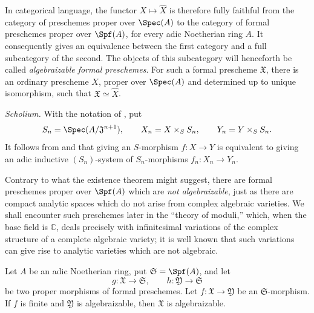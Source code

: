 In categorical language, the functor
$X\mapsto\widehat{X}$ is therefore fully faithful
 from the category of preschemes proper over
$\Spec(A)$ to the category of formal preschemes proper over
$\Spf(A)$, for every adic Noetherian ring $A$.  It consequently
gives an equivalence between the first category and a full
subcategory of the second.  The objects of this subcategory will
henceforth be called \emph{algebraizable formal preschemes}.  For
such a formal prescheme $\mathfrak{X}$, there is an ordinary
prescheme $X$, proper over $\Spec(A)$ and determined up to unique
isomorphism, such that $\mathfrak{X}\simeq\widehat{X}$.

\begin{env}[5.4.2]
\label{III.5.4.2}
\emph{Scholium.}
With the notation of , put
\[
  S_n=\Spec(A/\mathfrak{J}^{n+1}),\qquad
  X_n=X\times_S S_n,\qquad
  Y_n=Y\times_S S_n.
\]
It follows from  and  that
giving an $S$-morphism $f:X\to Y$ is equivalent to giving an adic
inductive $(S_n)$-system  of
$S_n$-morphisms $f_n:X_n\to Y_n$.
\end{env}

\begin{remark}[5.4.3]
\label{III.5.4.3}
Contrary to what the existence theorem  might
suggest, there are formal preschemes proper over $\Spf(A)$ which
are \emph{not algebraizable}, just as there are compact analytic
spaces which do not arise from complex algebraic varieties.  We
shall encounter such preschemes later in the ``theory of moduli,''
which, when the base field is $\mathbb{C}$, deals precisely with
infinitesimal variations of the complex structure of a complete
algebraic variety; it is well known that such variations can give
rise to analytic varieties which are not algebraic.
\end{remark}

\begin{proposition}[5.4.4]
\label{III.5.4.4}
Let $A$ be an adic Noetherian ring, put
$\mathfrak{S}=\Spf(A)$, and let
\[
  g:\mathfrak{X}\to\mathfrak{S},
  \qquad
  h:\mathfrak{Y}\to\mathfrak{S}
\]
be two proper morphisms of formal preschemes.  Let
$f:\mathfrak{X}\to\mathfrak{Y}$ be an
$\mathfrak{S}$-morphism.  If $f$ is finite and
$\mathfrak{Y}$ is algebraizable, then $\mathfrak{X}$ is
algebraizable.
\end{proposition}

